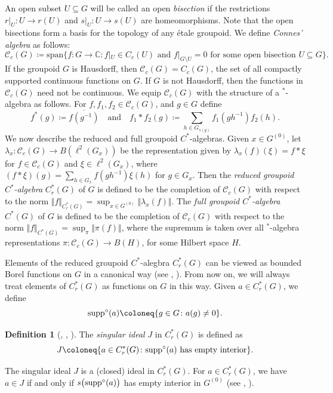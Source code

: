 \documentclass[11pt, oneside, reqno]{amsart}
\newcommand{\Gu}{G^{(0)}}
\newcommand{\cg}{\mathscr{C}_c(G)}
\newcommand{\supp}{{\rm supp}}
\newcommand{\osupp}{\supp^{\circ}}
\theoremstyle{definition}
\newtheorem{dfn}[thm]{Definition}
\theoremstyle{remark}
\numberwithin{equation}{section}
\begin{document}
An open subset $U \subseteq G$ will be called an open \emph{bisection} if the restrictions $r|_U \colon U \to r(U)$ and $s|_U \colon U \to s(U)$ are homeomorphisms. Note that the open bisections form a basis for the topology of any \'etale groupoid. We define \emph{Connes' algebra} as follows:
\[
\cg \coloneq \text{span}\{f \colon G \to \mathbb{C} \colon f|_U \in C_c(U) \text{ and } f|_{G \setminus U} = 0 \text{ for some open bisection } U \subseteq G\}.
\]
If the groupoid $G$ is Hausdorff, then $\cg = C_c(G)$, the set of all compactly supported continuous functions on $G$. If $G$ is not Hausdorff, then the functions in $\cg$ need not be continuous. We equip $\cg$ with the structure of a $^*$-algebra as follows. For $f, f_1, f_2 \in \cg$, and $g \in G$ define
\[
f^*(g) \coloneq \overline{f(g^{-1})} \quad \text{and} \quad f_1 * f_2 (g) \coloneq \sum_{h \in G_{s(g)}} f_1(gh^{-1})f_2(h).
\]
We now describe the reduced and full groupoid $C^*$-algebras. Given $x \in \Gu$, let $\lambda_x \colon \cg\to B(\ell^2(G_x))$ be the representation given by $\lambda_{x}(f)(\xi) = f * \xi$ for $f \in \cg$ and $\xi \in \ell^2(G_x)$, where $(f * \xi)(g) =  \sum_{h \in G_{x}} f(gh^{-1}) \xi(h)$ for $g \in G_x$. Then the \emph{reduced groupoid $C^*$-algebra} $C^*_r(G)$ of $G$ is defined to be the completion of $\cg$ with respect to the norm $\Vert f \Vert_{C^*_r(G)} = \sup_{x \in \Gu} \Vert \lambda_{x}(f) \Vert$. The \emph{full groupoid $C^*$-algebra} $C^*(G)$ of $G$ is defined to be the completion of $\cg$ with respect to the norm $\Vert f \Vert_{C^*(G)} = \sup_{\pi} \Vert \pi(f) \Vert$, where the supremum is taken over all $^*$-algebra representations $\pi \colon \cg \to B(H)$, for some Hilbert space $H$.

Elements of the reduced groupoid $C^*$-alegbra $C^*_r(G)$ can be viewed as bounded Borel functions on $G$ in a canonical way (see \cite[Lemma~3.15]{BM25}, \cite[Proposition~II.4.2]{Ren}). From now on, we will always treat elements of $C^*_r(G)$ as functions on $G$ in this way. Given $a \in C^*_r(G)$, we define
\[
\osupp(a) \coloneq \{g \in G \colon a(g) \neq 0\}.
\]
\begin{dfn}[\cite{CEPSS}, \cite{KM21}, \cite{EP22}]
    The \emph{singular ideal} $J$ in $C^*_r(G)$ is defined as
    \[
    J \coloneq \{a \in C^*_r(G) \colon \osupp(a) \text{ has empty interior}\}.
    \]
\end{dfn}
The singular ideal $J$ is a (closed) ideal in $C^*_r(G)$. For $a \in C^*_r(G)$, we have $a \in J$ if and only if $s\big(\osupp(a)\big)$ has empty interior in $\Gu$ (see \cite[Proposition~4.6]{BKM}, \cite[Lemma~4.1(iii)]{BGHL}).
\end{document}

